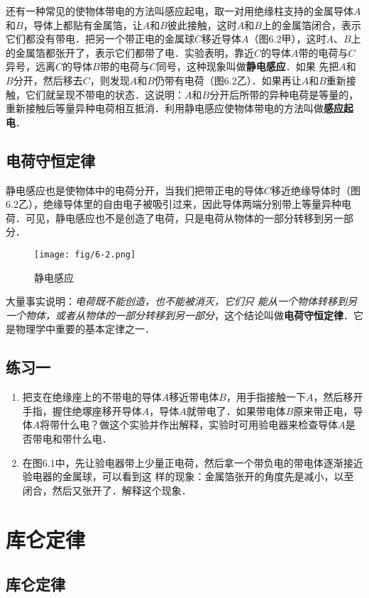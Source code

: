 还有一种常见的使物体带电的方法叫感应起电，取一对用绝缘柱支持的金属导体$A$和$B$，导体上都贴有金属箔，让$A$和$B$彼此接触，这时$A$和$B$上的金属箔闭合，表示它们都没有带电．把另一个带正电的金属球$C$移近导体$A$（图6.2甲），这时$A$、$B$上的金属箔都张开了，表示它们都带了电．实验表明，靠近$C$的导体$A$带的电荷与$C$异号，远离$C$的导体$B$带的电荷与$C$同号，这种现象叫做\textbf{静电感应}．如果
先把$A$和$B$分开，然后移去$C$，则发现$A$和$B$仍带有电荷（图6.2乙）．如果再让$A$和$B$重新接触，它们就呈现不带电的状态．这说明：$A$和$B$分开后所带的异种电荷是等量的，重新接触后等量异种电荷相互抵消．利用静电感应使物体带电的方法叫做\textbf{感应起电}．

\subsection{电荷守恒定律} 

静电感应也是使物体中的电荷分开，当我们把带正电的导体$C$移近绝缘导体时（图6.2乙），绝缘导体里的自由电子被吸引过来，因此导体两端分别带上等量异种电荷．可见，静电感应也不是创造了电荷，只是电荷从物体的一部分转移到另一部分．
\begin{figure}[htp]\centering
	\texttt{[image: fig/6-2.png]}
	\caption{静电感应}
	\end{figure}

大量事实说明：\textit{电荷既不能创造，也不能被消灭，它们只
能从一个物体转移到另一个物体，或者从物体的一部分转移到另一部分}，这个结论叫做\textbf{电荷守恒定律}．它是物理学中重要的基本定律之一．

\subsection*{练习一}
\begin{enumerate}
\item 把支在绝缘座上的不带电的导体$A$移近带电体$B$，用手指接触一下$A$，然后移开手指，握住绝塚座移开导体$A$，导体$A$就带电了．如果带电体$B$原来带正电，导体$A$将带什么电？做这个实验并作出解释，实验时可用验电器来检查导体$A$是否带电和带什么电．
\item 在图6.1中，先让验电器带上少量正电荷，然后拿一个带负电的带电体逐渐接近验电器的金属球，可以看到这
样的现象：金属箔张开的角度先是减小，以至闭合，然后又张开了．解释这个现象．
\end{enumerate}


\section{库仑定律}
\subsection{库仑定律} 

